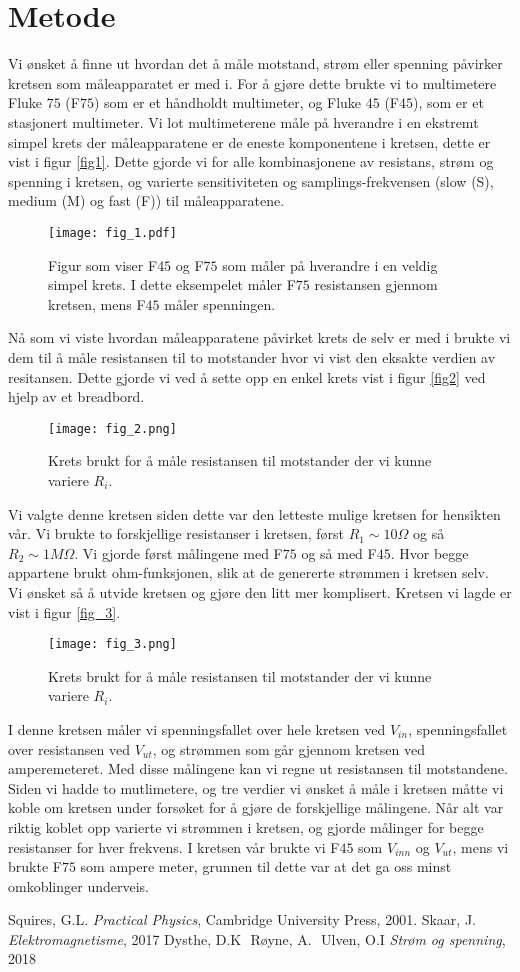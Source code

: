 \documentclass[%
 reprint,
 amsmath,amssymb,
 aps,
]{revtex4-1}
\begin{document}
\section{\label{metode1}Metode}
Vi ønsket å finne ut hvordan det å måle motstand, strøm eller spenning påvirker kretsen som måleapparatet er med i. For å gjøre dette brukte vi to multimetere Fluke $75$ (F$75$) som er et håndholdt multimeter, og Fluke $45$ (F$45$), som er et stasjonert multimeter. Vi lot multimeterene måle på hverandre i en ekstremt simpel krets der måleapparatene er de eneste komponentene i kretsen, dette er vist i figur \vref{fig1}. Dette gjorde vi for alle kombinasjonene av resistans, strøm og spenning i kretsen, og varierte sensitiviteten og samplings-frekvensen (slow (S), medium (M) og fast (F)) til måleapparatene. \\
\begin{figure}[h!]
    \centering
    \texttt{[image: fig\_1.pdf]}
    \caption{Figur som viser F$45$ og F$75$ som måler på hverandre i en veldig simpel krets. I dette eksempelet måler F$75$ resistansen gjennom kretsen, mens F$45$ måler spenningen.}
    \label{fig1}
\end{figure}
Nå som vi viste hvordan måleapparatene påvirket krets de selv er med i brukte vi dem til å måle resistansen til to motstander hvor vi vist den eksakte verdien av resitansen. Dette gjorde vi ved å sette opp en enkel krets vist i figur \vref{fig2} ved hjelp av et breadbord.
\begin{figure}[h!]
    \centering
    \texttt{[image: fig\_2.png]}
    \caption{Krets brukt for å måle resistansen til motstander der vi kunne variere $R_i$.}
    \label{fig2}
\end{figure}
Vi valgte denne kretsen siden dette var den letteste mulige kretsen for hensikten vår. Vi brukte to forskjellige resistanser i kretsen, først $R_1 \sim 10 \Omega$ og så $R_2 \sim 1 M\Omega$. Vi gjorde først målingene med F$75$ og så med F$45$. Hvor begge appartene brukt ohm-funksjonen, slik at de genererte strømmen i kretsen selv.\\
Vi ønsket så å utvide kretsen og gjøre den litt mer komplisert. Kretsen vi lagde er vist i figur \vref{fig_3}.
\begin{figure}[h!]
    \centering
    \texttt{[image: fig\_3.png]}
    \caption{Krets brukt for å måle resistansen til motstander der vi kunne variere $R_i$.}
    \label{fig2}
\end{figure}
I denne kretsen måler vi spenningsfallet over hele kretsen ved $V_{in}$, spenningsfallet over resistansen ved $V_{ut}$, og strømmen som går gjennom kretsen ved amperemeteret. Med disse målingene kan vi regne ut resistansen til motstandene. Siden vi hadde to mutlimetere, og tre verdier vi ønsket å måle i kretsen måtte vi koble om kretsen under forsøket for å gjøre de forskjellige målingene. Når alt var riktig koblet opp varierte vi strømmen i kretsen, og gjorde målinger for begge resistanser for hver frekvens. I kretsen vår brukte vi F$45$ som $V_{inn}$ og $V_{ut}$, mens vi brukte F$75$ som ampere meter, grunnen til dette var at det ga oss minst omkoblinger underveis.

\begin{thebibliography}{9}
Squires, G.L. \emph{Practical Physics}, Cambridge University Press, 2001.
Skaar, J. \emph{Elektromagnetisme}, 2017
Dysthe, D.K\,\, Røyne, A.\,\, Ulven, O.I \emph{Strøm og spenning}, 2018
 \end{thebibliography}
\end{document}
